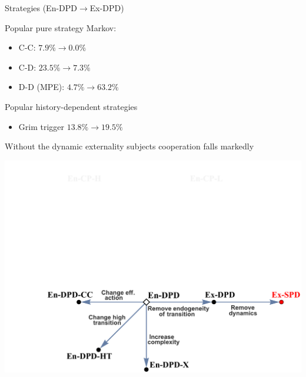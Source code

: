 \documentclass{beamer}
\begin{document}
\begin{frame}{Strategies (En-DPD$\rightarrow$Ex-DPD)}

\begin{card}
Popular pure strategy Markov:
\begin{itemize}
\item C-C: $7.9\%\rightarrow0.0\%$
\item C-D: $23.5\%\rightarrow7.3\%$
\item D-D (MPE): $4.7\%\rightarrow63.2\%$
\end{itemize}
\end{card}
\begin{card} 
Popular history-dependent strategies
\begin{itemize}
\item Grim trigger $13.8\%\rightarrow19.5\%$
\end{itemize}
\end{card}

\end{frame}

\begin{frame}

\begin{card}[Result 5]
Without the dynamic externality subjects cooperation falls
markedly
\end{card}
\end{frame}


\begin{frame}

\begin{card}
\begin{center}\includegraphics[height=0.7\textwidth]{./i/FlowChart6.pdf}
\end{center}
\end{card}
\end{frame}
\end{document}
